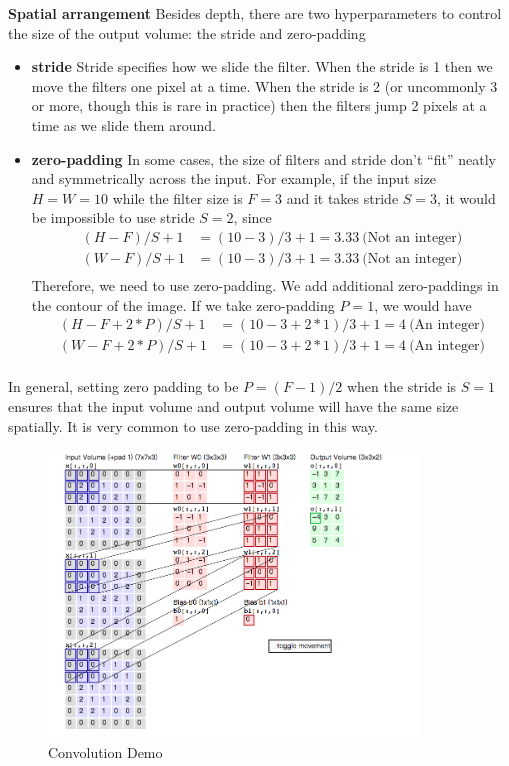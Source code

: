 \documentclass[twoside]{article}
\begin{document}
\textbf{Spatial arrangement} Besides depth, there are two hyperparameters to control the size of the output volume: the stride and zero-padding
\begin{itemize}
\item \textbf{stride} Stride specifies how we slide the filter. When the stride is 1 then we move the filters one pixel at a time. When the stride is 2 (or uncommonly 3 or more, though this is rare in practice) then the filters jump 2 pixels at a time as we slide them around. 
\item \textbf{zero-padding} In some cases, the size of filters and stride don’t “fit” neatly and symmetrically across the input. For example, if the input size $H=W=10$ while the filter size is $F=3$ and it takes stride $S=3$, it would be impossible to use stride $S=2$, since 
\begin{equation}
\begin{aligned}
(H-F)/S+1&=(10-3)/3+1=3.33~\text{(Not an integer)}\\
(W-F)/S+1&=(10-3)/3+1=3.33~\text{(Not an integer)}\\
\end{aligned}
\end{equation}
Therefore, we need to use zero-padding. We add additional zero-paddings in the contour of the image. If we take zero-padding $P=1$, we would have 
\begin{equation}
\begin{aligned}
(H-F+2*P)/S+1&=(10-3+2*1)/3+1=4~\text{(An integer)}\\
(W-F+2*P)/S+1&=(10-3+2*1)/3+1=4~\text{(An integer)}\\
\end{aligned}
\end{equation}
\end{itemize} 

In general, setting zero padding to be $P=(F−1)/2$ when the stride is $S=1$ ensures that the input volume and output volume will have the same size spatially. It is very common to use zero-padding in this way.
 
\begin{figure}[!htb]
\centering
\includegraphics[height = 3in]{pics/cnn.png}
\caption{Convolution Demo\cite{cs231n-website}}
\label{fig:conv_demo}
\end{figure}
\end{document}
